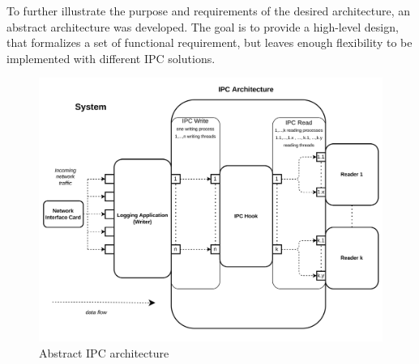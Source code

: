 To further illustrate the purpose and requirements of the desired architecture, an abstract architecture was developed.
The goal is to provide a high-level design, that formalizes a set of functional requirement, but leaves enough
flexibility to be implemented with different \ac{IPC} solutions.  

\begin{figure}[h!]
    \includegraphics[width=\textwidth]{images/meta_ipc_architecture.png}
    \caption[IPC Architecture]{Abstract \ac{IPC} architecture}
    \label{fig:abstract_architecture}
\end{figure}

